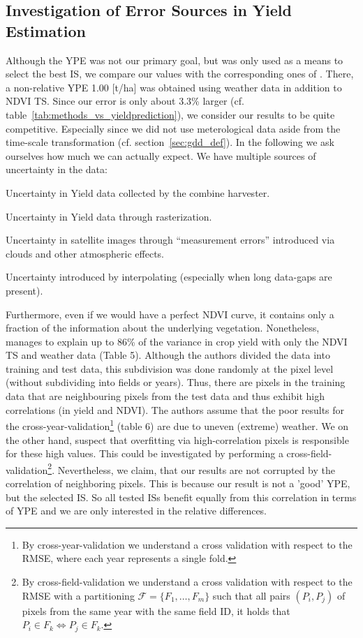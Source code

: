 {    \subsection{Investigation of Error Sources in Yield Estimation}{\label{sec:discuss_high-rmse-in-yield-prdiction}
        Although the YPE was not our primary goal, but was only used as a means to select the best IS, we compare our values with the corresponding ones of \cite{perichPixelbasedCropYield2022}. There, a non-relative YPE 1.00 [t/ha] was obtained using weather data in addition to NDVI TS. Since our error is only about 3.3\% larger (cf. table~\ref{tab:methods_vs_yieldprediction}), we consider our results to be quite competitive. Especially since we did not use meterological data aside from the time-scale transformation (cf. section~\ref{sec:gdd_def}). In the following we ask ourselves how much we can actually expect. We have multiple sources of uncertainty in the data:
        \begin{Nenumerate}
            \item Uncertainty in Yield data collected by the combine harvester.
            \item Uncertainty in Yield data through rasterization.
            \item Uncertainty in satellite images through ``measurement errors'' introduced via clouds and other atmospheric effects.
            \item Uncertainty introduced by interpolating (especially when long data-gaps are present).
        \end{Nenumerate}
        Furthermore, even if we would have a perfect NDVI curve, it contains only a fraction of the information about the underlying vegetation. 
        Nonetheless, \cite{perichPixelbasedCropYield2022} manages to explain up to 86\% of the variance in crop yield with only the NDVI TS and weather data (Table 5).  Although the authors divided the data into training and test data, this subdivision was done randomly at the pixel level (without subdividing into fields or years). Thus, there are pixels in the training data that are neighbouring pixels from the test data and thus exhibit high correlations (in yield and NDVI). The authors assume that the poor results for the cross-year-validation\footnote{By cross-year-validation we understand a cross validation with respect to the RMSE, where each year represents a single fold.} (table 6) are due to uneven (extreme) weather. We on the other hand, suspect that overfitting via high-correlation pixels is responsible for these high values. This could be investigated by performing a cross-field-validation\footnote{By cross-field-validation we understand a cross validation with respect to the RMSE with a partitioning $\mathcal{F}=\{F_1,\dots,F_m\}$ such that all pairs $(P_i,P_j)$ of pixels from the same year with the same field ID, it holds that $P_i\in F_k \iff P_j\in F_k$.}. 
        Nevertheless, we claim, that our results are not corrupted by the correlation of neighboring pixels. This is because our result is not a 'good' YPE, but the selected IS. So all tested ISs benefit equally from this correlation in terms of YPE and we are only interested in the relative differences.

}}
